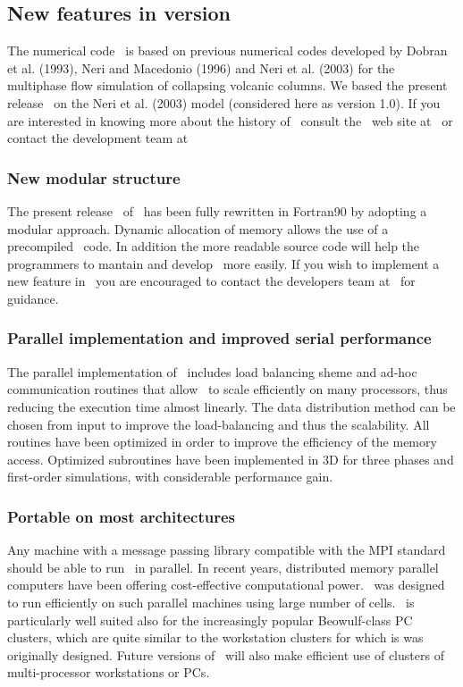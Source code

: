 \begin{itemize}
\end{itemize}

\subsection{New features in version \PDACVERSION}

The numerical code \PDAC\ is based on previous numerical codes developed
by Dobran et al. (1993), Neri and Macedonio (1996) and Neri et al. (2003)
for the multiphase flow simulation of collapsing volcanic columns. We based
the present release \PDACVERSION\ on the Neri et al. (2003) model (considered 
here as version 1.0). If you are interested in knowing more about
the history of \PDAC\, consult the \PDAC\ web site at 
\PDACURL\ or contact the development team at 
\PDACADDRESS\

\subsubsection*{New modular structure}
The present release \PDACVERSION\ of \PDAC\ has been fully rewritten in 
Fortran90 by adopting a modular approach. Dynamic allocation of memory
allows the use of a precompiled \PDAC\ code. In addition the more readable 
source code will help the programmers to mantain and develop \PDAC\ more easily.
If you wish to implement a new feature in \PDAC\ you are encouraged to contact 
the developers team at \PDACADDRESS\ for guidance.

\subsubsection*{Parallel implementation and improved serial performance}
The parallel implementation of \PDAC\ includes load balancing sheme 
and ad-hoc communication routines that allow \PDAC\ to scale efficiently 
on many processors, thus reducing the execution time almost linearly.
The data distribution method can be chosen from input to improve the 
load-balancing and thus the scalability. All routines have been 
optimized in order to improve the efficiency of the memory access.
Optimized subroutines have been implemented in 3D for three phases and
first-order simulations, with considerable performance gain.

\subsubsection*{Portable on most architectures}
Any machine with a message passing library compatible with the MPI 
standard should be able to run \PDAC\ in parallel.
In recent years, distributed memory parallel computers have been offering
cost-effective computational power.  \PDAC\ was designed to run efficiently
on such parallel machines using large number of cells. 
\PDAC\ is particularly well suited also for the increasingly popular Beowulf-class PC 
clusters, which are quite similar to the workstation clusters for which is was 
originally designed.
Future versions of \PDAC\ will also make efficient use of clusters of 
multi-processor workstations or PCs.

